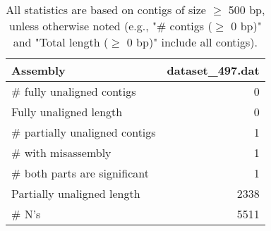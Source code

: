 \documentclass[12pt,a4paper]{article}
\begin{document}
\begin{table}[ht]
\begin{center}
\caption{All statistics are based on contigs of size $\geq$ 500 bp, unless otherwise noted (e.g., "\# contigs ($\geq$ 0 bp)" and "Total length ($\geq$ 0 bp)" include all contigs).}
\begin{tabular}{|l*{1}{|r}|}
\hline
Assembly & dataset\_497.dat \\ \hline
\# fully unaligned contigs & 0 \\ \hline
Fully unaligned length & 0 \\ \hline
\# partially unaligned contigs & 1 \\ \hline
\hspace{5mm}\# with misassembly & 1 \\ \hline
\hspace{5mm}\# both parts are significant & 1 \\ \hline
Partially unaligned length & 2338 \\ \hline
\# N's & 5511 \\ \hline
\end{tabular}
\end{center}
\end{table}
\end{document}
